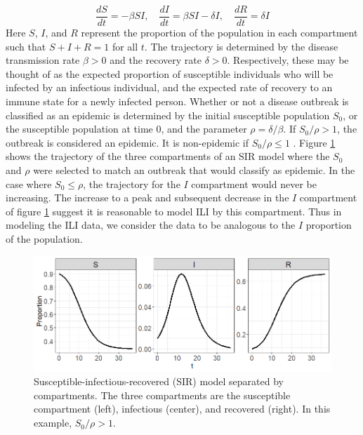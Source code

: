 \documentclass[ba]{imsart}
\theoremstyle{plain}
\theoremstyle{definition}
\theoremstyle{remark}
\begin{document}
\begin{equation}
    \label{eq:sir_diff}
    \frac{dS}{dt} = -\beta SI, \quad \frac{dI}{dt} = \beta S I - \delta I, \quad \frac{dR}{dt} = \delta I
\end{equation}
Here $S$, $I$, and $R$ represent the proportion of the population in each compartment such that $S + I + R = 1$ for all $t$. The trajectory is determined by the disease transmission rate $\beta > 0$ and the recovery rate $\delta > 0$. Respectively, these may be thought of as the expected proportion of susceptible individuals who will be infected by an infectious individual, and the expected rate of recovery to an immune state for a newly infected person. Whether or not a disease outbreak is classified as an epidemic is determined by the initial susceptible population $S_0$, or the susceptible population at time $0$, and the parameter $\rho = \delta/
\beta$. If $S_0/\rho > 1$, the outbreak is considered an epidemic. It is non-epidemic if $S_0/\rho \leq 1$ \cite[]{osthus2019dynamic}. Figure \ref{fig:sir_traj} shows the trajectory of the three compartments of an SIR model where the $S_0$ and $\rho$ were selected to match an outbreak that would classify as epidemic. In the case where $S_0 \leq \rho$, the trajectory for the $I$ compartment would never be increasing. The increase to a peak and subsequent decrease in the $I$ compartment of figure \ref{fig:sir_traj} suggest it is reasonable to model ILI by this compartment. Thus in modeling the ILI data, we consider the data to be analogous to the $I$ proportion of the population.

\begin{figure}
    \centering
    \includegraphics[scale=.6]{Images/sir_traj.png}
    \caption{Susceptible-infectious-recovered (SIR) model separated by compartments. The three compartments are the susceptible compartment (left), infectious (center), and recovered (right). In this example, $S_0/\rho > 1$.}
    \label{fig:sir_traj}
\end{figure}
\end{document}
